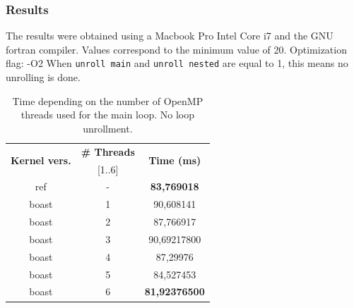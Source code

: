 \documentclass[10pt,twoside]{article}   	%
\begin{document}
\subsubsection{Results}

The results were obtained using a Macbook Pro Intel Core i7 and the GNU fortran compiler. Values correspond to the minimum value of 20. Optimization flag: -O2
When \texttt{unroll main} and \texttt{unroll nested} are equal to 1, this means no unrolling is done.

\begin{table}[ht!]
\centering
\caption{Time depending on the number of OpenMP threads used for the main loop. No loop unrollment.}
{\scriptsize
\begin{tabular}{|c|c|c|} \hline 
\multirow{2}{*}{ {{\bf{Kernel vers.}}} }	 	  &  {{\bf{\# Threads}}}    &  \multirow{2}{*}{ {{\bf{Time (ms)}}} }  \\ 
					 		  & 	 	[1..6]   &  				\\ \hline \hline
ref  &         -  &  {\bf{83,769018}} \\ \hline
boast &     1 & 90,608141 \\ \hline
boast &      2 & 87,766917 \\  \hline
boast &    3 & 90,69217800 \\ \hline
boast &     4 & 87,29976 \\  \hline
boast &    5 & 84,527453 \\  \hline
boast &   6 & {\bf{81,92376500}} \\ \hline
\end{tabular}
}
\label{tab:1}
\end{table}
\end{document}
